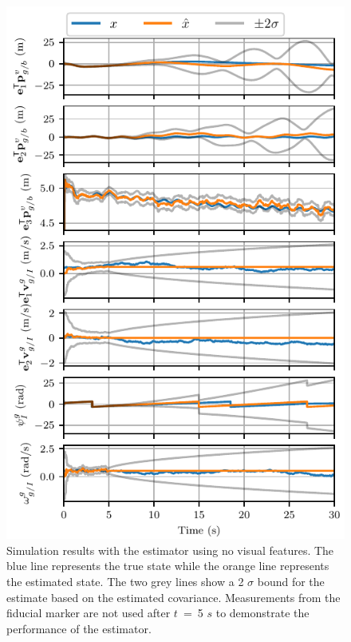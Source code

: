 \begin{figure}
  \centering
  \includegraphics[width=6.5in]{plots/single_run_no_lms}
  \caption{Simulation results with the estimator using no visual
  features. The blue line represents the true state while the orange line
  represents the estimated state. The two grey lines show a 2 $\sigma$ bound for
  the estimate based on the estimated covariance. Measurements from the fiducial
  marker are not used after $t$~=~5
$s$ to demonstrate the performance of the estimator.}
  \label{fig:no_lms_gp}
\end{figure}

